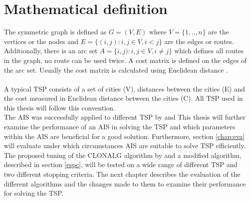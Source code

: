 \section{Mathematical definition}
The symmetric graph is defined as $G=(V,E)$ where $V=\{1,..,n\}$ are the vertices or the nodes and $E=\{(i,j):i,j\in V, i<j\}$ are the edges or routes. Additionally, there is an arc set $A=\{i,j):i,j\in V, i\neq j\}$ which defines all routes in the graph, no route can be used twice. A cost matrix is defined on the edges of the arc set. Usually the cost matrix is calculated using Euclidean distance \cite{Matai10}.\\\\
A typical TSP consists of a set of cities (V), distances between the cities (E) and the cost measured in Euclidean distance between the cities (C). All TSP used in this thesis will follow this convention.\\
The AIS was successfully applied to different TSP by \cite{DEC02} and \cite{RIFF09} This thesis will further examine the performance of an AIS in solving the TSP and which parameters within the AIS are beneficial for a good solution. Furthermore, section \ref{chap:eva} will evaluate under which circumstances AIS are suitable to solve TSP efficiently. The proposed tuning of the CLONALG algorithm by \cite{DEC02} and a modified algorithm, described in section \ref{espc}, will be tested on a wide range of different TSP and two different stopping criteria.
 The next chapter describes the evaluation of the different algorithms and the changes made to them to examine their performance for solving the TSP.


 


